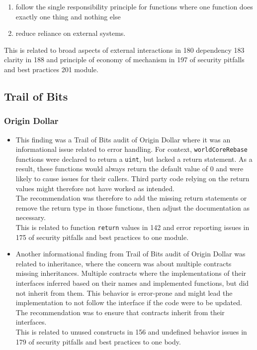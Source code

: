 \begin{enumerate}
\def\labelenumi{\arabic{enumi}.}
\tightlist
\item
  follow the single responsibility principle for functions where one
  function does exactly one thing and nothing else
\item
  reduce reliance on external systems.
\end{enumerate}

This is related to broad aspects of external interactions in 180
dependency 183 clarity in 188 and principle of economy of mechanism in
197 of security pitfalls and best practices 201 module.

\subsection{Trail of Bits}\label{trail-of-bits}

\subsubsection{Origin Dollar}\label{origin-dollar}

\begin{itemize}
\item
  This finding was a Trail of Bits audit of Origin Dollar where it was
  an informational issue related to error handling. For context,
  \texttt{worldCoreRebase} functions were declared to return a
  \texttt{uint}, but lacked a return statement. As a result, these
  functions would always return the default value of 0 and were likely
  to cause issues for their callers. Third party code relying on the
  return values might therefore not have worked as intended.\\

  The recommendation was therefore to add the missing return statements
  or remove the return type in those functions, then adjust the
  documentation as necessary.\\

  This is related to function \texttt{return} values in 142 and error
  reporting issues in 175 of security pitfalls and best practices to one
  module.
\item
  Another informational finding from Trail of Bits audit of Origin
  Dollar was related to inheritance, where the concern was about
  multiple contracts missing inheritances. Multiple contracts where the
  implementations of their interfaces inferred based on their names and
  implemented functions, but did not inherit from them. This behavior is
  error-prone and might lead the implementation to not follow the
  interface if the code were to be updated. The recommendation was to
  ensure that contracts inherit from their interfaces.\\

  This is related to unused constructs in 156 and undefined behavior
  issues in 179 of security pitfalls and best practices to one body.
\end{itemize}

